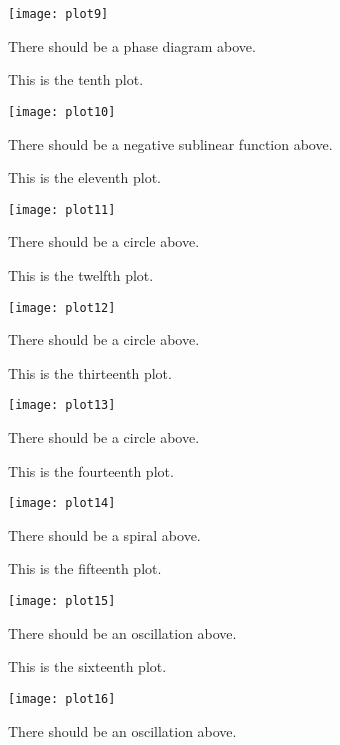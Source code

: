 \documentclass{article}
\begin{document}
\texttt{[image: plot9]}

There should be a phase diagram above.

\bigskip

This is the tenth plot.

\texttt{[image: plot10]}

There should be a negative sublinear function above.

\bigskip

This is the eleventh plot.

\texttt{[image: plot11]}

There should be a circle above.

\bigskip

This is the twelfth plot.

\texttt{[image: plot12]}

There should be a circle above.

\bigskip

This is the thirteenth plot.

\texttt{[image: plot13]}

There should be a circle above.

\bigskip

This is the fourteenth plot.

\texttt{[image: plot14]}

There should be a spiral above.

\bigskip

This is the fifteenth plot.

\texttt{[image: plot15]}

There should be an oscillation above.

\bigskip

This is the sixteenth plot.

\texttt{[image: plot16]}

There should be an oscillation above.
\end{document}
